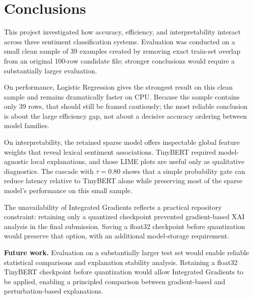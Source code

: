 \documentclass[10pt]{article}
\begin{document}
\section{Conclusions}

This project investigated how accuracy, efficiency, and interpretability
interact across three sentiment classification systems.  Evaluation was
conducted on a small clean sample of 39 examples created by removing exact
train-set overlap from an original 100-row candidate file; stronger conclusions
would require a substantially larger evaluation.

On performance, Logistic Regression gives the strongest result on this clean
sample and remains dramatically faster on CPU.  Because the sample contains
only 39 rows, that should still be framed cautiously; the most reliable
conclusion is about the large efficiency gap, not about a decisive accuracy
ordering between model families.

On interpretability, the retained sparse model offers inspectable global
feature weights that reveal lexical sentiment associations.  TinyBERT required model-agnostic local
explanations, and those LIME plots are useful only as qualitative diagnostics.
The cascade with $\tau = 0.80$ shows that a simple probability gate can reduce
latency relative to TinyBERT alone while preserving most of the sparse model's
performance on this small sample.

The unavailability of Integrated Gradients reflects a practical repository
constraint: retaining only a quantized checkpoint prevented gradient-based XAI
analysis in the final submission.  Saving a float32 checkpoint before
quantization would preserve that option, with an additional model-storage requirement.

\textbf{Future work.}  Evaluation on a substantially larger test set would
enable reliable statistical comparisons and explanation stability analysis.
Retaining a float32 TinyBERT checkpoint before quantization would allow
Integrated Gradients to be applied, enabling a principled comparison between
gradient-based and perturbation-based explanations.


\end{document}
